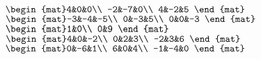 \begin{Exercise}[
name={},
title={}, 
difficulty=0,
origin={\cite{GH}}]
\begin{multicols}{2}
\Question $\begin{mat}4&0&0\\  -2&-7&0\\  4&-2&5 \end{mat}$
\Question $\begin{mat}-3&-4&-5\\  0&-3&5\\  0&0&-3 \end{mat}$
\Question $\begin{mat}1&0\\  0&9 \end{mat}$
\Question $\begin{mat}4&0&-2\\  0&2&3\\  -2&3&6 \end{mat}$
\Question $\begin{mat}0&-6&1\\  6&0&4\\  -1&-4&0 \end{mat}$
\EndCurrentQuestion
\end{multicols}

\end{Exercise}

